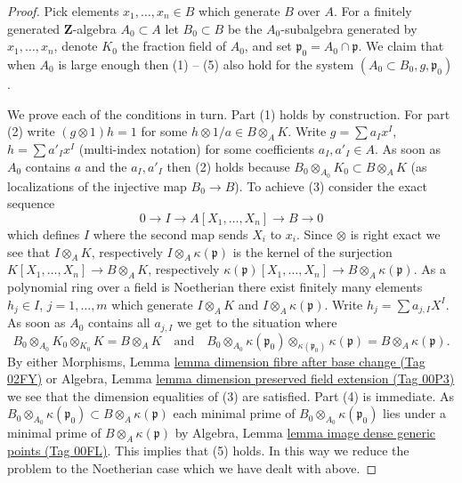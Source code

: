 \documentclass{amsart}
\theoremstyle{plain}
\theoremstyle{definition}
\theoremstyle{remark}
\numberwithin{equation}{subsection}
\begin{document}
\begin{proof}
\medskip\noindent
Pick elements $x_1, \ldots, x_n \in B$ which generate $B$ over $A$.
For a finitely generated $\mathbf{Z}$-algebra $A_0 \subset A$
let $B_0 \subset B$ be the $A_0$-subalgebra generated by
$x_1, \ldots, x_n$, denote $K_0$ the fraction field of $A_0$, and set
$\mathfrak p_0 = A_0 \cap \mathfrak p$.
We claim that when $A_0$ is large enough then (1) -- (5) also hold for
the system $(A_0 \subset B_0, g, \mathfrak p_0)$.

\medskip\noindent
We prove each of the conditions in turn. Part (1) holds by construction.
For part (2) write $(g \otimes 1) h = 1$ for some
$h \otimes 1/a \in B \otimes_A K$. Write
$g = \sum a_I x^I$, $h = \sum a'_I x^I$ (multi-index notation)
for some coefficients $a_I, a'_I \in A$. As soon as $A_0$ contains
$a$ and the $a_I, a'_I$ then (2) holds because
$B_0 \otimes_{A_0} K_0 \subset B \otimes_A K$ (as localizations of the
injective map $B_0 \to B$).
To achieve (3) consider the exact sequence
$$
0 \to I \to A[X_1, \ldots, X_n] \to B \to 0
$$
which defines $I$ where the second map sends $X_i$ to $x_i$. Since $\otimes$
is right exact we see that $I \otimes_A K$, respectively
$I \otimes_A \kappa(\mathfrak p)$ is the kernel of the surjection
$K[X_1, \ldots, X_n] \to B \otimes_A K$, respectively
$\kappa(\mathfrak p)[X_1, \ldots, X_n] \to B \otimes_A \kappa(\mathfrak p)$.
As a polynomial ring over a field is Noetherian
there exist finitely many elements $h_j \in I$, $j = 1, \ldots, m$
which generate $I \otimes_A K$ and $I \otimes_A \kappa(\mathfrak p)$.
Write $h_j = \sum a_{j, I}X^I$. As soon as
$A_0$ contains all $a_{j, I}$ we get to the situation where
$$
B_0 \otimes_{A_0} K_0 \otimes_{K_0} K = B \otimes_A K
\quad\text{and}\quad
B_0 \otimes_{A_0} \kappa(\mathfrak p_0)
\otimes_{\kappa(\mathfrak p_0)} \kappa(\mathfrak p)
=
B \otimes_A \kappa(\mathfrak p).
$$
By either
Morphisms, Lemma \href{https://stacks.math.columbia.edu/tag/02FY}{lemma dimension fibre after base change (Tag 02FY)}
or
Algebra, Lemma \href{https://stacks.math.columbia.edu/tag/00P3}{lemma dimension preserved field extension (Tag 00P3)}
we see that the dimension equalities of (3) are satisfied.
Part (4) is immediate. As
$B_0 \otimes_{A_0} \kappa(\mathfrak p_0) \subset
B \otimes_A \kappa(\mathfrak p)$ each minimal prime of
$B_0 \otimes_{A_0} \kappa(\mathfrak p_0)$ lies under a minimal
prime of $B \otimes_A \kappa(\mathfrak p)$ by
Algebra, Lemma \href{https://stacks.math.columbia.edu/tag/00FL}{lemma image dense generic points (Tag 00FL)}.
This implies that (5) holds.
In this way we reduce the problem to the Noetherian case which we
have dealt with above.
\end{proof}
\end{document}
